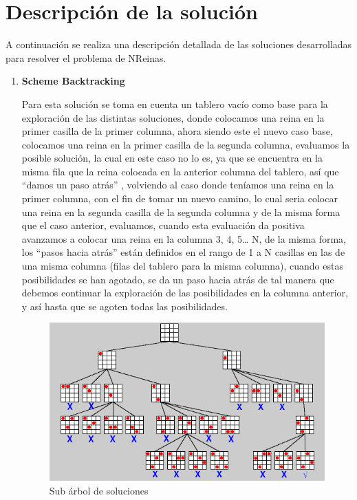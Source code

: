 \documentclass[12pt,a4paper]{article}
\begin{document}
\section{Descripción de la solución}
\bigskip
	A continuación se realiza una descripción detallada de las soluciones desarrolladas para resolver el problema de NReinas.
\begin{enumerate}
\item  \textbf{Scheme Backtracking}

Para esta solución se toma en cuenta un tablero vacío como base para la exploración de las distintas soluciones, donde colocamos una reina en la primer casilla de la primer columna, ahora siendo este el nuevo caso base, colocamos una reina en la primer casilla de la segunda columna, evaluamos la posible solución, la cual en este caso no lo es, ya que se encuentra en la misma fila que la reina colocada en la anterior columna del tablero, así que  “damos un paso atrás” , volviendo al caso donde teníamos una reina en la primer columna, con el fin de tomar un nuevo camino, lo cual seria colocar una reina en la segunda casilla de la segunda columna y de la misma forma que el caso anterior, evaluamos, cuando esta evaluación da positiva avanzamos a colocar una reina en la columna 3, 4, 5… N, de la misma forma, los “pasos hacia atrás”  están definidos en el rango de 1 a N casillas en las de una misma columna (filas del tablero para la misma columna), cuando estas posibilidades se han agotado, se da un paso hacia atrás de tal manera que debemos continuar la exploración de las posibilidades en la columna anterior, y así hasta que se agoten todas las posibilidades.

\begin{figure}[htp]
\centering
\graphicspath{ {imagenes/} }
\includegraphics[scale=0.50]{general.png}
\caption{Sub árbol de soluciones}
\label{foto}
\end{figure}


\end{enumerate}
\end{document}
